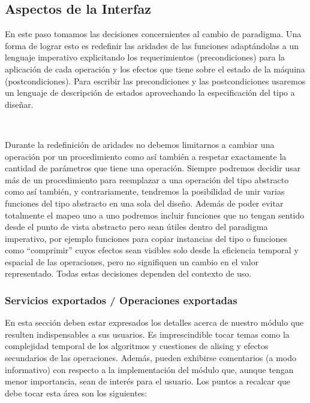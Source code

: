 \documentclass[10pt, a4paper]{report}
\begin{document}
\subsection{Aspectos de la Interfaz}

En este paso tomamos las decisiones concernientes al cambio de paradigma. Una forma de lograr esto es redefinir las aridades de las funciones adapt\'andolas a un lenguaje imperativo explicitando los requerimientos (precondiciones) para la aplicaci\'on de cada operaci\'on y los efectos que tiene sobre el estado de la m\'aquina (postcondiciones). Para escribir las precondiciones y las postcondiciones usaremos un lenguaje de descripci\'on de estados aprovechando la especificaci\'on del tipo a dise\~nar.

~

Durante la redefinici\'on de aridades no debemos limitarnos a cambiar una operaci\'on por un procedimiento como as\'i tambi\'en a respetar exactamente la cantidad de par\'ametros que tiene una operaci\'on. Siempre podremos decidir usar m\'as de un procedimiento para reemplazar a una operaci\'on del tipo abstracto como as\'i tambi\'en, y contrariamente, tendremos la posibilidad de unir varias funciones del tipo abstracto en una sola del dise\~no. Adem\'as de poder evitar totalmente el mapeo uno a uno podremos incluir funciones que no tengan sentido desde el punto de vista abstracto pero sean \'utiles dentro del paradigma imperativo, por ejemplo funciones para copiar instancias del tipo o funciones como ``comprimir'' cuyos efectos sean visibles solo desde la eficiencia temporal y espacial de las operaciones, pero no signifiquen un cambio en el valor representado. Todas estas decisiones dependen del contexto de uso.

\subsubsection{Servicios exportados / Operaciones exportadas}

En esta secci\'on deben estar expresados los detalles acerca de nuestro m\'odulo que resulten indispensables a sus usuarios. Es imprescindible tocar temas como la complejidad temporal de los algoritmos y cuestiones de alising y efectos secundarios de las operaciones. Adem\'as, pueden exhibirse comentarios (a modo informativo) con respecto a la implementaci\'on del m\'odulo que, aunque tengan menor importancia, sean de inter\'es para el usuario. Los puntos a recalcar que debe tocar esta \'area son los siguientes:
\end{document}
